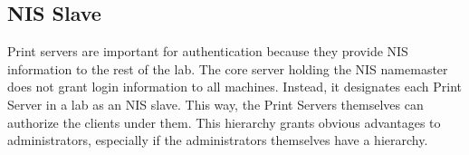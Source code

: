 \subsection{NIS Slave}
Print servers are important for authentication because they provide NIS information to the rest of the lab.  The core server holding the NIS namemaster does not grant login information to all machines.  Instead, it designates each Print Server in a lab as an NIS slave.  This way, the Print Servers themselves can authorize the clients under them.  This hierarchy grants obvious advantages to administrators, especially if the administrators themselves have a hierarchy.  
